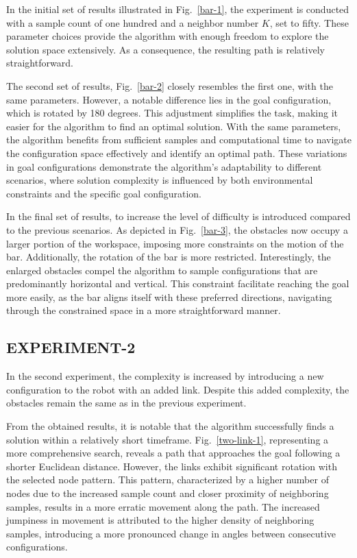 \documentclass{IEEEtaes}
\begin{document}
In the initial set of results illustrated in Fig.~\ref{bar-1}, the experiment is conducted with a sample count of one hundred and a neighbor number $K$, set to fifty. These parameter choices provide the algorithm with enough freedom to explore the solution space extensively. As a consequence, the resulting path is relatively straightforward.

The second set of results, Fig.~\ref{bar-2} closely resembles the first one, with the same parameters. However, a notable difference lies in the goal configuration, which is rotated by 180 degrees. This adjustment simplifies the task, making it easier for the algorithm to find an optimal solution. With the same parameters, the algorithm benefits from sufficient samples and computational time to navigate the configuration space effectively and identify an optimal path. These variations in goal configurations demonstrate the algorithm's adaptability to different scenarios, where solution complexity is influenced by both environmental constraints and the specific goal configuration.

In the final set of results, to increase the level of difficulty is introduced compared to the previous scenarios. As depicted in Fig.~\ref{bar-3}, the obstacles now occupy a larger portion of the workspace, imposing more constraints on the motion of the bar. Additionally, the rotation of the bar is more restricted. Interestingly, the enlarged obstacles compel the algorithm to sample configurations that are predominantly horizontal and vertical. This constraint facilitate reaching the goal more easily, as the bar aligns itself with these preferred directions, navigating through the constrained space in a more straightforward manner. 
\subsection{\fontsize{10}{13}\selectfont EXPERIMENT-2}
In the second experiment, the complexity is increased by introducing a new configuration to the robot with an added link. Despite this added complexity, the obstacles remain the same as in the previous experiment.

From the obtained results, it is notable that the algorithm successfully finds a solution within a relatively short timeframe. Fig.~\ref{two-link-1}, representing a more comprehensive search, reveals a path that approaches the goal following a shorter Euclidean distance. However, the links exhibit significant rotation with the selected node pattern. This pattern, characterized by a higher number of nodes due to the increased sample count and closer proximity of neighboring samples, results in a more erratic movement along the path. The increased jumpiness in movement is attributed to the higher density of neighboring samples, introducing a more pronounced change in angles between consecutive configurations.
\end{document}

